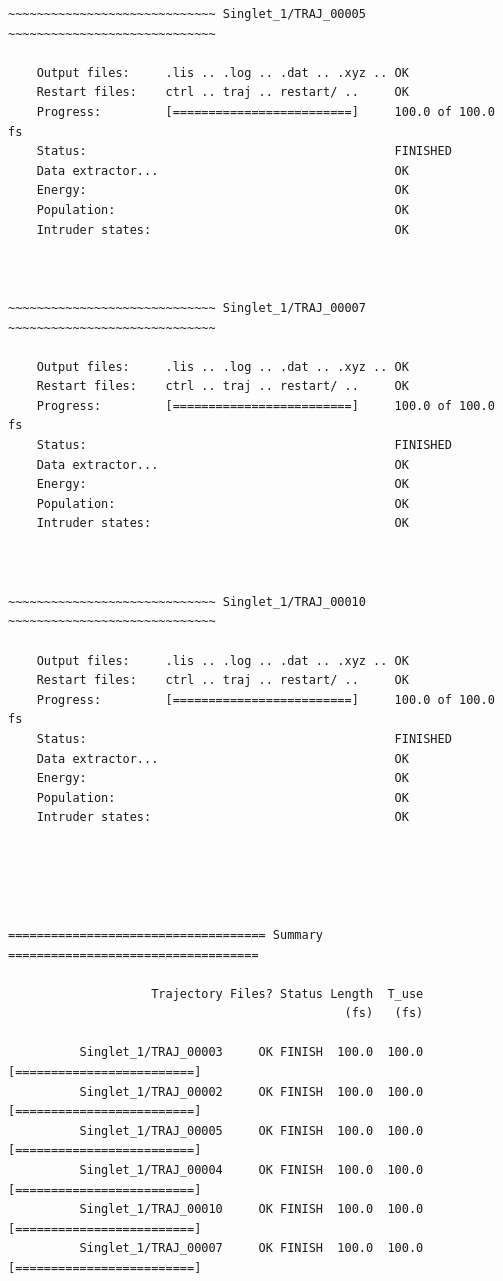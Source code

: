 \documentclass[a4paper,11pt,DIV=15,openany]{scrbook}
\begin{document}
\begin{oframed}
\begin{Verbatim}[commandchars=\\\{\}]
~~~~~~~~~~~~~~~~~~~~~~~~~~~~~ Singlet_1/TRAJ_00005 ~~~~~~~~~~~~~~~~~~~~~~~~~~~~~

    Output files:     .lis .. .log .. .dat .. .xyz .. OK
    Restart files:    ctrl .. traj .. restart/ ..     OK
    Progress:         [=========================]     100.0 of 100.0 fs
    Status:                                           FINISHED
    Data extractor...                                 OK
    Energy:                                           OK
    Population:                                       OK
    Intruder states:                                  OK



~~~~~~~~~~~~~~~~~~~~~~~~~~~~~ Singlet_1/TRAJ_00007 ~~~~~~~~~~~~~~~~~~~~~~~~~~~~~

    Output files:     .lis .. .log .. .dat .. .xyz .. OK
    Restart files:    ctrl .. traj .. restart/ ..     OK
    Progress:         [=========================]     100.0 of 100.0 fs
    Status:                                           FINISHED
    Data extractor...                                 OK
    Energy:                                           OK
    Population:                                       OK
    Intruder states:                                  OK



~~~~~~~~~~~~~~~~~~~~~~~~~~~~~ Singlet_1/TRAJ_00010 ~~~~~~~~~~~~~~~~~~~~~~~~~~~~~

    Output files:     .lis .. .log .. .dat .. .xyz .. OK
    Restart files:    ctrl .. traj .. restart/ ..     OK
    Progress:         [=========================]     100.0 of 100.0 fs
    Status:                                           FINISHED
    Data extractor...                                 OK
    Energy:                                           OK
    Population:                                       OK
    Intruder states:                                  OK





==================================== Summary ===================================

                    Trajectory Files? Status Length  T_use
                                               (fs)   (fs)

          Singlet_1/TRAJ_00003     OK FINISH  100.0  100.0   [=========================]
          Singlet_1/TRAJ_00002     OK FINISH  100.0  100.0   [=========================]
          Singlet_1/TRAJ_00005     OK FINISH  100.0  100.0   [=========================]
          Singlet_1/TRAJ_00004     OK FINISH  100.0  100.0   [=========================]
          Singlet_1/TRAJ_00010     OK FINISH  100.0  100.0   [=========================]
          Singlet_1/TRAJ_00007     OK FINISH  100.0  100.0   [=========================]


\end{Verbatim}
\end{oframed}
\end{document}
